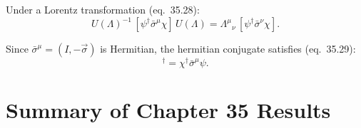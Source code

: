\documentclass[12pt]{article}
\begin{document}
\medskip
Under a Lorentz transformation (eq.~35.28):
\begin{equation}
  U(\Lambda)^{-1}\,[\psi^\dagger\bar\sigma^\mu\chi]\,U(\Lambda)
  = {\Lambda^\mu}{}_\nu\,[\psi^\dagger\bar\sigma^\nu\chi].
  \tag{35.28}
\end{equation}

Since $\bar\sigma^\mu = (I,-\vec\sigma)$ is Hermitian,
the hermitian conjugate satisfies (eq.~35.29):
\begin{equation}
  [\psi^\dagger\bar\sigma^\mu\chi]^\dagger = \chi^\dagger\bar\sigma^\mu\psi.
  \tag{35.29}
\end{equation}

\section{Summary of Chapter 35 Results}
\end{document}
